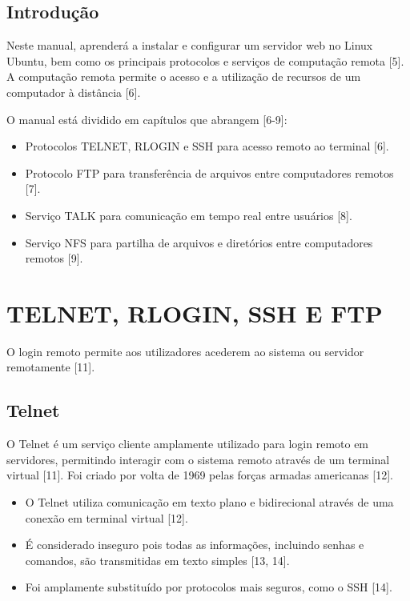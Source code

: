 \documentclass[12pt, a4paper]{article}
\begin{document}
	\section*{Introdução}
	Neste manual, aprenderá a instalar e configurar um servidor web no Linux Ubuntu, bem como os principais protocolos e serviços de computação remota [5]. A computação remota permite o acesso e a utilização de recursos de um computador à distância [6].
	
	O manual está dividido em capítulos que abrangem [6-9]:
	\begin{itemize}
		\item Protocolos TELNET, RLOGIN e SSH para acesso remoto ao terminal [6].
		\item Protocolo FTP para transferência de arquivos entre computadores remotos [7].
		\item Serviço TALK para comunicação em tempo real entre usuários [8].
		\item Serviço NFS para partilha de arquivos e diretórios entre computadores remotos [9].
	\end{itemize}
	
	\newpage
	
	
	\chapter{TELNET, RLOGIN, SSH E FTP} %
	O login remoto permite aos utilizadores acederem ao sistema ou servidor remotamente [11].
	
	\section{Telnet} %
	O Telnet é um serviço cliente amplamente utilizado para login remoto em servidores, permitindo interagir com o sistema remoto através de um terminal virtual [11]. Foi criado por volta de 1969 pelas forças armadas americanas [12].
	\begin{itemize}
		\item O Telnet utiliza comunicação em texto plano e bidirecional através de uma conexão em terminal virtual [12].
		\item É considerado inseguro pois todas as informações, incluindo senhas e comandos, são transmitidas em texto simples [13, 14].
		\item Foi amplamente substituído por protocolos mais seguros, como o SSH [14].
	\end{itemize}
\end{document}

